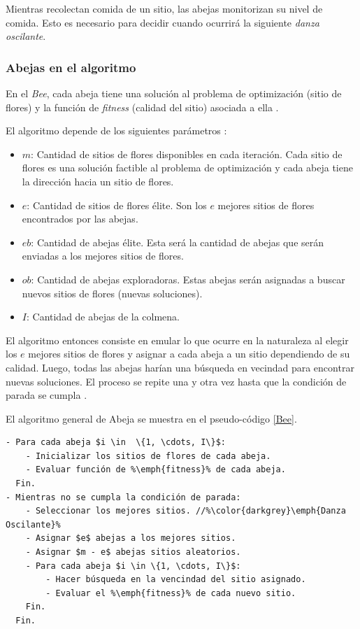     Mientras recolectan comida de un sitio, las abejas monitorizan su nivel de
comida. Esto es necesario para decidir cuando ocurrirá la siguiente
\emph{danza oscilante}\cite{BEE_0}.

\subsubsection{Abejas en el algoritmo}

    En el \emph{Bee}, cada abeja tiene una solución al problema de optimización
(sitio de flores) y la función de \emph{fitness} (calidad del sitio) asociada a
ella \cite{BEE_0}.

    El algoritmo depende de los siguientes parámetros \cite{BEE_0}:
\begin{itemize}
    \item $m$: Cantidad de sitios de flores disponibles en cada iteración.
Cada sitio de flores es una solución factible al problema de optimización y
cada abeja tiene la dirección hacia un sitio de flores.
    \item $e$: Cantidad de sitios de flores élite. Son los $e$ mejores sitios de
flores encontrados por las abejas.
    \item $eb$: Cantidad de abejas élite. Esta será la cantidad de abejas que
serán enviadas a los mejores sitios de flores.
    \item $ob$: Cantidad de abejas exploradoras. Estas abejas serán asignadas a
buscar nuevos sitios de flores (nuevas soluciones).
    \item $I$: Cantidad de abejas de la colmena.
\end{itemize}

    El algoritmo entonces consiste en emular lo que ocurre en la naturaleza al
elegir los $e$ mejores sitios de flores y asignar a cada abeja a un sitio
dependiendo de su calidad. Luego, todas las abejas harían una búsqueda en
vecindad para encontrar nuevas soluciones. El proceso se repite una y otra vez
hasta que la condición de parada se cumpla \cite{BEE_0}.

    El algoritmo general de Abeja se muestra en el pseudo-código \ref{Bee}.
\begin{lstlisting}[float=h, caption=Algoritmo General de Abeja\cite{BEE_0}, label=Bee]
- Para cada abeja $i \in  \{1, \cdots, I\}$:
    - Inicializar los sitios de flores de cada abeja.
    - Evaluar función de %\emph{fitness}% de cada abeja.
  Fin.
- Mientras no se cumpla la condición de parada:
    - Seleccionar los mejores sitios. //%\color{darkgrey}\emph{Danza Oscilante}%
    - Asignar $e$ abejas a los mejores sitios.
    - Asignar $m - e$ abejas sitios aleatorios.
    - Para cada abeja $i \in \{1, \cdots, I\}$:
        - Hacer búsqueda en la vencindad del sitio asignado.
        - Evaluar el %\emph{fitness}% de cada nuevo sitio.
    Fin.
  Fin.
\end{lstlisting}

